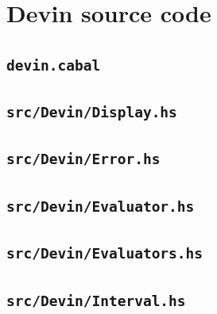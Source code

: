 \documentclass[UdineBachThesis,american,11pt]{PhdThesis}
\begin{document}
  \backmatter

  \appendix

  \chapter{Devin source code}
  \label{chapter:devin-source-code}

  \section{\texttt{devin.cabal}}

  \vspace{\prevdepth-\depthof{\strut}}

  \section{\texttt{src/Devin/Display.hs}}

  \vspace{\prevdepth-\depthof{\strut}}

  \section{\texttt{src/Devin/Error.hs}}

  \vspace{\prevdepth-\depthof{\strut}}

  \section{\texttt{src/Devin/Evaluator.hs}}

  \vspace{\prevdepth-\depthof{\strut}}

  \section{\texttt{src/Devin/Evaluators.hs}}

  \vspace{\prevdepth-\depthof{\strut}}

  \section{\texttt{src/Devin/Interval.hs}}
\end{document}
